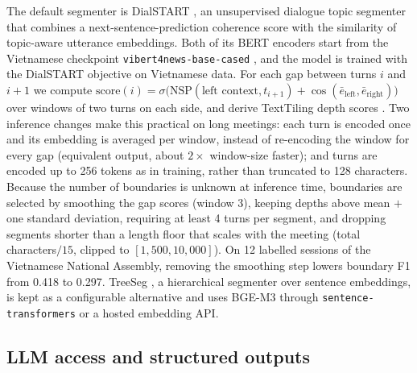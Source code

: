 The default segmenter is DialSTART \citep{gao2023dialstart}, an unsupervised dialogue topic segmenter that combines a next-sentence-prediction coherence score with the similarity of topic-aware utterance embeddings.
Both of its BERT encoders \citep{devlin2019bert} start from the Vietnamese checkpoint \texttt{vibert4news-base-cased} \citep{vibert4news}, and the model is trained with the DialSTART objective on Vietnamese data.
For each gap between turns $i$ and $i{+}1$ we compute
$\mathrm{score}(i)=\sigma\big(\mathrm{NSP}(\text{left context}, t_{i+1}) + \cos(\bar e_{\text{left}}, \bar e_{\text{right}})\big)$
over windows of two turns on each side, and derive TextTiling depth scores \citep{hearst1997texttiling}.
Two inference changes make this practical on long meetings: each turn is encoded once and its embedding is averaged per window, instead of re-encoding the window for every gap (equivalent output, about $2\times$ window-size faster); and turns are encoded up to 256 tokens as in training, rather than truncated to 128 characters.
Because the number of boundaries is unknown at inference time, boundaries are selected by smoothing the gap scores (window 3), keeping depths above mean $+$ one standard deviation, requiring at least 4 turns per segment, and dropping segments shorter than a length floor that scales with the meeting (total characters$/15$, clipped to $[1{,}500, 10{,}000]$).
On 12 labelled sessions of the Vietnamese National Assembly, removing the smoothing step lowers boundary F1 from 0.418 to 0.297.
TreeSeg \citep{gklezakos2024treeseg}, a hierarchical segmenter over sentence embeddings, is kept as a configurable alternative and uses BGE-M3 \citep{chen2024bgem3} through \texttt{sentence-transformers} or a hosted embedding API.

\subsection{LLM access and structured outputs}
\label{sec:system:llm}


